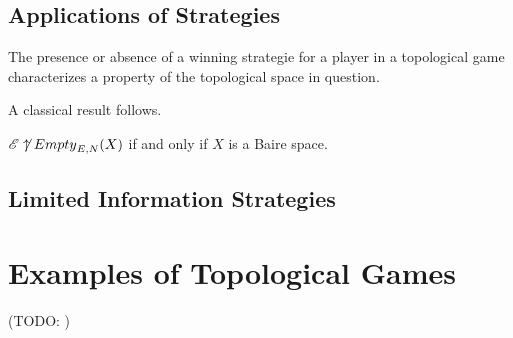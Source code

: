 \subsection{Applications of Strategies}

The presence or absence of a winning strategie for a player in a topological
game characterizes a property of the topological space in question.

A classical result follows.

\begin{thm}
$\mathscr{E}\not\uparrow {Empty}_{E,N}(X)$ if and only if $X$ is a Baire space. \cite{haworth}
\end{thm}


\subsection{Limited Information Strategies}


\section{Examples of Topological Games}

(TODO: )










